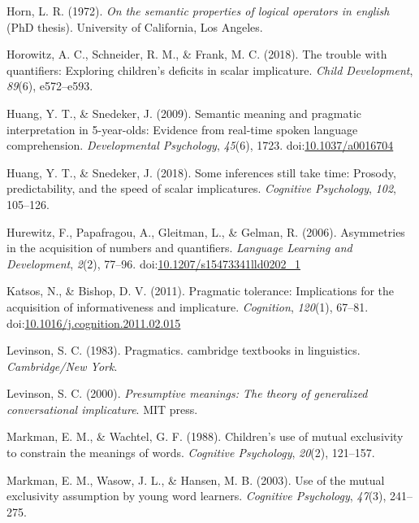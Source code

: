 \documentclass[man]{apa6}
\begin{document}
\hypertarget{ref-horn1972}{}
Horn, L. R. (1972). \emph{On the semantic properties of logical
operators in english} (PhD thesis). University of California, Los
Angeles.

\hypertarget{ref-horowitz2018}{}
Horowitz, A. C., Schneider, R. M., \& Frank, M. C. (2018). The trouble
with quantifiers: Exploring children's deficits in scalar implicature.
\emph{Child Development}, \emph{89}(6), e572--e593.

\hypertarget{ref-huang2009b}{}
Huang, Y. T., \& Snedeker, J. (2009). Semantic meaning and pragmatic
interpretation in 5-year-olds: Evidence from real-time spoken language
comprehension. \emph{Developmental Psychology}, \emph{45}(6), 1723.
doi:\href{https://doi.org/10.1037/a0016704}{10.1037/a0016704}

\hypertarget{ref-huang2018}{}
Huang, Y. T., \& Snedeker, J. (2018). Some inferences still take time:
Prosody, predictability, and the speed of scalar implicatures.
\emph{Cognitive Psychology}, \emph{102}, 105--126.

\hypertarget{ref-hurewitz2006}{}
Hurewitz, F., Papafragou, A., Gleitman, L., \& Gelman, R. (2006).
Asymmetries in the acquisition of numbers and quantifiers.
\emph{Language Learning and Development}, \emph{2}(2), 77--96.
doi:\href{https://doi.org/10.1207/s15473341lld0202_1}{10.1207/s15473341lld0202\_1}

\hypertarget{ref-katsos2011}{}
Katsos, N., \& Bishop, D. V. (2011). Pragmatic tolerance: Implications
for the acquisition of informativeness and implicature.
\emph{Cognition}, \emph{120}(1), 67--81.
doi:\href{https://doi.org/10.1016/j.cognition.2011.02.015}{10.1016/j.cognition.2011.02.015}

\hypertarget{ref-levinson1983}{}
Levinson, S. C. (1983). Pragmatics. cambridge textbooks in linguistics.
\emph{Cambridge/New York}.

\hypertarget{ref-levinson2000}{}
Levinson, S. C. (2000). \emph{Presumptive meanings: The theory of
generalized conversational implicature}. MIT press.

\hypertarget{ref-markman1988children}{}
Markman, E. M., \& Wachtel, G. F. (1988). Children's use of mutual
exclusivity to constrain the meanings of words. \emph{Cognitive
Psychology}, \emph{20}(2), 121--157.

\hypertarget{ref-markman2003use}{}
Markman, E. M., Wasow, J. L., \& Hansen, M. B. (2003). Use of the mutual
exclusivity assumption by young word learners. \emph{Cognitive
Psychology}, \emph{47}(3), 241--275.
\end{document}

